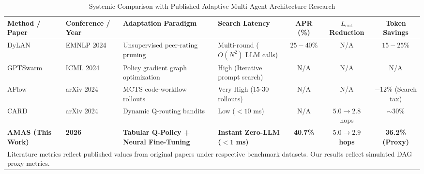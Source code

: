 \begin{table}[t]
\centering
\caption{Systemic Comparison with Published Adaptive Multi-Agent Architecture Research}
\label{tab:literature_comparison}
\begin{tabular}{l l l l c c c}
\toprule
\textbf{Method / Paper} & \textbf{Conference / Year} & \textbf{Adaptation Paradigm} & \textbf{Search Latency} & \textbf{APR (\%)} & \textbf{$L_{\text{crit}}$ Reduction} & \textbf{Token Savings} \\
\midrule
DyLAN \cite{dylan2024} & EMNLP 2024 & Unsupervised peer-rating pruning & Multi-round ($O(N^2)$ LLM calls) & $25-40\%$ & N/A & $15-25\%$ \\
GPTSwarm \cite{gptswarm2024} & ICML 2024 & Policy gradient graph optimization & High (Iterative prompt search) & N/A & N/A & N/A \\
AFlow \cite{aflow2024} & arXiv 2024 & MCTS code-workflow rollouts & Very High (15-30 rollouts) & N/A & N/A & $-12\%$ (Search tax) \\
CARD \cite{card2024} & arXiv 2024 & Dynamic Q-routing bandits & Low ($<10$ ms) & N/A & $5.0 \to 2.8$ hops & $\sim 30\%$ \\
\midrule
\textbf{AMAS (This Work)} & \textbf{2026} & \textbf{Tabular Q-Policy + Neural Fine-Tuning} & \textbf{Instant Zero-LLM ($<1$ ms)} & \textbf{40.7\%} & \textbf{$5.0 \to 2.9$ hops} & \textbf{36.2\% (Proxy)} \\
\bottomrule
\multicolumn{7}{l}{\footnotesize Literature metrics reflect published values from original papers under respective benchmark datasets. Our results reflect simulated DAG proxy metrics.} \\
\end{tabular}
\end{table}

